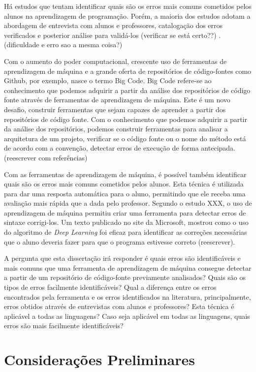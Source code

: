 Há estudos que tentam identificar quais são os erros mais comuns cometidos pelos alunos na aprendizagem de programação. Porém, a maioria dos estudos adotam a abordagem de entrevista com alunos e professores, catalogação dos erros verificados e posterior análise para validá-los (verificar se está certo??) \cite{Hristova:2003:ICJ:792548.611956}.  (dificuldade e erro sao a mesma coisa?)

Com o aumento do poder computacional, crescente uso de ferramentas de aprendizagem de máquina e a grande oferta de repositórios de código-fontes como Github, por exemplo, nasce o termo Big Code. Big Code refere-se ao conhecimento que podemos adquirir a partir da análise dos repositórios de código fonte através de ferramentas de aprendizagem de máquina. Este é um novo desafio, construir ferramentas que sejam capazes de aprender a partir dos repositórios de código fonte. Com o conhecimento que podemos adquirir a partir da análise dos repositórios, podemos construir ferramentas para analisar a arquitetura de um projeto, verificar se o código fonte ou o nome do método está de acordo com a convenção, detectar erros de execução de forma antecipada. (reescrever com referências)

Com as ferramentas de aprendizagem de máquina, é possível também identificar quais são os erros mais comuns cometidos pelos alunos. Esta técnica é utilizada para dar uma resposta automática para o aluno, permitindo que ele receba uma avaliação mais rápida que a dada pelo professor. Segundo o estudo XXX, o uso de aprendizagem de máquina permitiu criar uma ferramenta para detectar erros de sintaxe corrigi-los. Um texto publicado no site da Microsoft, mostrou como o uso do algoritmo de \textit{Deep Learning} foi eficaz para identificar as correções necessárias que o aluno deveria fazer para que o programa estivesse correto (reescrever).

A pergunta que esta dissertação irá responder é quais erros são identificáveis e mais comuns que uma ferramenta de aprendizagem de máquina consegue detectar a partir de um repositório de código-fonte previamente analisados? Quais são os tipos de erros facilmente identificáveis? Qual a diferença entre os erros encontrados pela ferramenta e os erros identificados na literatura, principalmente, erros obtidos através de entrevistas com alunos e professores? Esta técnica é aplicável a todas as linguagens? Caso seja aplicável em todas as linguagens, quais erros são mais facilmente identificáveis?


\section{Considerações Preliminares}
\label{sec:consideracoes_preliminares}

